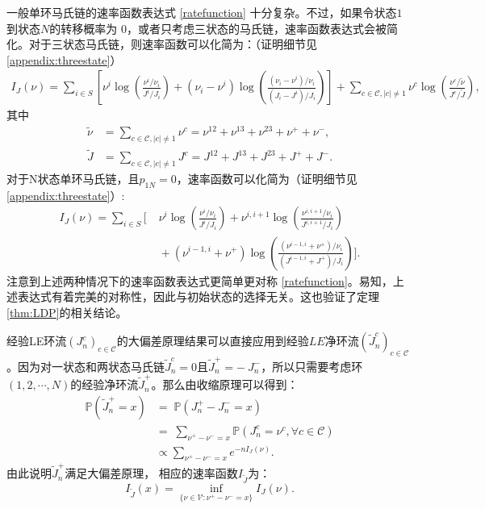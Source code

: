 一般单环马氏链的速率函数表达式 \eqref{ratefunction} 十分复杂。不过，如果令状态$1$到状态$N$的转移概率为 0，或者只考虑三状态的马氏链，速率函数表达式会被简化。对于三状态马氏链，则速率函数可以化简为：（证明细节见 \ref{appendix:threestate}）
\begin{align*}
    I_J(\nu) =
    \sum_{i\in S} \left[\nu^{i}\log \left(\frac{\nu^{i}/\nu_i}{J^i/J_i}\right) + (\nu_i - \nu^i)\log \left(\frac{(\nu_i - \nu^i)/\nu_i}{(J_i - J^i)/J_i} \right)
    \right]
    + \sum_{c\in\mathcal{C},|c|\neq 1} \nu^{c} \log \left(\frac{\nu^{c}/\tilde{\nu}}{J^c/\tilde{J}}\right) ,
\end{align*}
其中
\begin{align*}
    \tilde{\nu} &=\sum_{c\in\mathcal{C},|c|\neq 1}\nu^{c}
    = \nu^{12}+\nu^{13}+\nu^{23}+\nu^++\nu^-,\\
    \tilde{J} &=\sum_{c\in\mathcal{C},|c|\neq 1}J^{c}
    = J^{12}+J^{13}+J^{23}+J^++J^-.
\end{align*}
对于N状态单环马氏链，且$p_{1N}=0$，速率函数可以化简为（证明细节见 \ref{appendix:threestate}）:
\begin{equation}\label{lack}
    \begin{split}
        I_J(\nu) = \sum_{i\in S}\Bigg[&\;\nu^i\log\left(\frac{\nu^i/\nu_i}{J^i/J_i}\right)
        +\nu^{i,i+1}\log\left(\frac{\nu^{i,i+1}/\nu_i}{J^{i,i+1}/J_i}\right)\\
        &\;+\left(\nu^{i-1,i}+\nu^+\right)\log\left(\frac{\left(\nu^{i-1,i}+\nu^+\right)/\nu_i}
        {\left(J^{i-1,i}+J^+\right)/J_i}\right)\Bigg].
    \end{split}
\end{equation}
注意到上述两种情况下的速率函数表达式更简单更对称 \eqref{ratefunction}。易知，上述表达式有着完美的对称性，因此与初始状态的选择无关。这也验证了定理\ref{thm:LDP}的相关结论。

经验LE环流$(J^{c}_n)_{c\in\mathcal{C}}$的大偏差原理结果可以直接应用到经验$LE$净环流$(\tilde{J}^{c}_n)_{c\in\mathcal{C}}$。因为对一状态和两状态马氏链$\tilde{J}^c_n = 0$且$\tilde{J}^+_n = -\ {J}^-_n$，所以只需要考虑环$(1, 2, \cdots ,N)$的经验净环流$\tilde{J}^+_n$。那么由收缩原理可以得到：
\begin{equation}\label{tilde I J}
	\begin{split}
		\mathbb{P}\left(\tilde{J}^{+}_n = x\right)
		&=\;\mathbb{P}\left(J^{+}_n-J^{-}_n = x\right)\\
		&=\;\sum_{\nu^{+}-\nu^{-}=x}\mathbb{P}\left(J^{c}_n=\nu^{c},\forall c\in\mathcal{C}\right)\\
		&\propto\sum_{\nu^{+}-\nu^{-}=x} e^{-nI_J(\nu)}.
	\end{split}
\end{equation}
由此说明$\tilde{J}^+_n$满足大偏差原理， 相应的速率函数$I_{\tilde{J}}$为：
\begin{equation*}
	I_{\tilde{J}}(x)=\inf_{\{\nu\in\mathcal{V}:\nu^{+}-\nu^{-}= x\}}I_J(\nu).
\end{equation*} 

